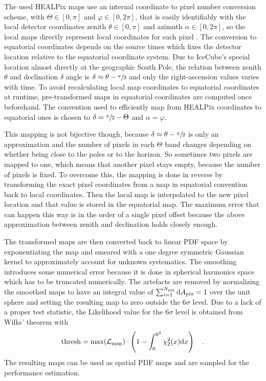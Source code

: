 The used HEALPix maps use an internal coordinate to pixel number conversion scheme, with $\Theta\in[0, \pi]$ and $\varphi\in[0, 2\pi]$, that is easily identifiably with the local detector coordinates zenith $\theta\in[0, \pi]$ and azimuth $\alpha\in[0, 2\pi]$, so the local maps directly represent local coordinates for each pixel .
The conversion to equatorial coordinates depends on the source times which fixes the detector location relative to the equatorial coordinate system.
Due to IceCube's special location almost directly at the geographic South Pole, the relation between zenith $\theta$ and declination $\delta$ angle is $\delta \approx \theta - \sfrac{\pi}{2}$ and only the right-ascension values varies with time.
To avoid recalculating local map coordinates to equatorial coordinates at runtime, pre-transformed maps in equatorial coordinates are computed once beforehand.
The convention used to efficiently map from HEALPix coordinates to equatorial ones is chosen to $\delta = \sfrac{\pi}{2} - \Theta$ and $\alpha = \varphi$.

This mapping is not bijective though, because $\delta \approx \theta - \sfrac{\pi}{2}$ is only an approximation and the number of pixels in each $\Theta$ band changes depending on whether being close to the poles or to the horizon.
So sometimes two pixels are mapped to one, which means that another pixel stays empty, because the number of pixels is fixed.
To overcome this, the mapping is done in reverse by transforming the exact pixel coordinates from a map in equatorial convention back to local coordinates.
Then the local map is interpolated to the new pixel location and that value is stored in the equatorial map.
The maximum error that can happen this way is in the order of a single pixel offset because the above approximation between zenith and declination holds closely enough.

The transformed maps are then converted back to linear PDF space by exponentiating the map and smeared with a one degree symmetric Gaussian kernel to approximately account for unknown systematics.
The smoothing introduces some numerical error because it is done in spherical harmonics space which has to be truncated numerically.
The artefacts are removed by normalizing the smoothed maps to have an integral value of $\sum_{i=1}^{N_\text{pix}} \mathrm{d}A_\text{pix} = 1$ over the unit sphere and setting the resulting map to zero outside the $6\sigma$ level.
Due to a lack of a proper test statistic, the Likelihood value for the $6\sigma$ level is obtained from Wilks' theorem with
\begin{equation}
  \text{thresh} =
    \max(\mathcal{L}_\text{map})\cdot
    \left(1 - \int_0^{6^2}\chi^2_{2}(x)\mathrm{d}x\right)
  \quad\text{.}
\end{equation}
The resulting maps can be used as spatial PDF maps and are sampled for the performance estimation.


